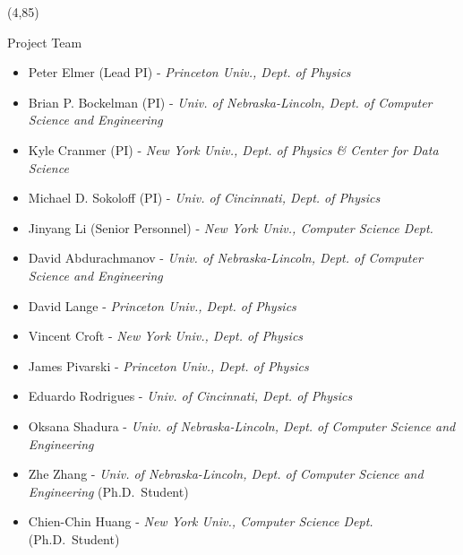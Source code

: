 \documentclass[final]{beamer}
\begin{document}
\begin{frame}{}







\begin{textblock}{38.0}(4,85)
\begin{block}{Project Team}
\begin{itemize}
\item Peter Elmer (Lead PI) - {\it Princeton Univ., Dept. of Physics}
\item Brian P. Bockelman (PI) - {\it Univ. of Nebraska-Lincoln, Dept. of Computer Science and Engineering}
\item Kyle Cranmer (PI) - {\it New York Univ., Dept. of Physics \& Center for Data Science}
\item Michael D. Sokoloff (PI) - {\it Univ. of Cincinnati, Dept. of Physics}
\item Jinyang Li (Senior Personnel) - {\it New York Univ., Computer Science Dept.}
\item David Abdurachmanov - {\it Univ. of Nebraska-Lincoln, Dept. of Computer Science and Engineering}
\item David Lange - {\it Princeton Univ., Dept. of Physics}
\item Vincent Croft - {\it New York Univ., Dept. of Physics}
\item James Pivarski - {\it Princeton Univ., Dept. of Physics}
\item Eduardo Rodrigues - {\it Univ. of Cincinnati, Dept. of Physics}
\item Oksana Shadura - {\it Univ. of Nebraska-Lincoln, Dept. of Computer Science and Engineering}
\item Zhe Zhang - {\it Univ. of Nebraska-Lincoln, Dept. of Computer Science and Engineering} (Ph.D.\ Student)
\item Chien-Chin Huang - {\it New York Univ., Computer Science Dept.} (Ph.D.\ Student)
\end{itemize}
\end{block}
\end{textblock}


\end{frame}
\end{document}
